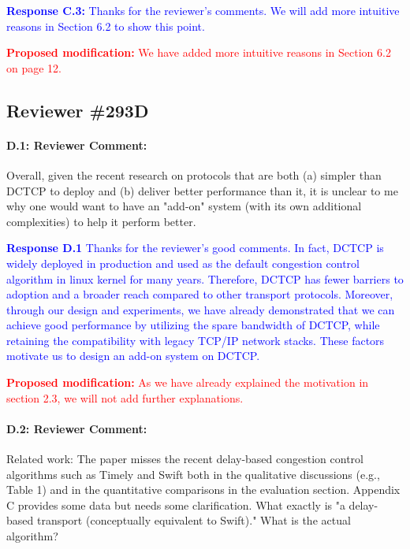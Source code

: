 \documentclass[12pt,one-column]{article}
\begin{document}
\noindent\textcolor{blue}{\textbf{Response C.3:}
Thanks for the reviewer's comments. 
We will add more intuitive reasons in Section 6.2 to show this point.
}

\noindent\textcolor{red}{\textbf{Proposed modification: }
We have added more intuitive reasons in Section 6.2 on page 12.
}

\subsection{Reviewer \#293D}

{\it \paragraph{D.1: Reviewer Comment:}Overall, given the recent research on protocols that are both (a) simpler than DCTCP to deploy and (b) deliver better performance than it, it is unclear to me why one would want to have an "add-on" system (with its own additional complexities) to help it perform better.}

\noindent\textcolor{blue}{\textbf{Response D.1}
Thanks for the reviewer's good comments.
In fact, DCTCP is widely deployed in production and used as the default congestion control algorithm in linux kernel for many years.
Therefore, DCTCP has fewer barriers to adoption and a broader reach compared to other transport protocols.
Moreover, through our design and experiments, we have already demonstrated that we can achieve good performance by utilizing the spare bandwidth of DCTCP, while retaining the compatibility with legacy TCP/IP network stacks.
These factors motivate us to design an add-on system on DCTCP.
} 

\noindent\textcolor{red}{\textbf{Proposed modification: }
As we have already explained the motivation in section 2.3, we will not add further explanations.
}

{\it \paragraph{D.2: Reviewer Comment:}Related work: The paper misses the recent delay-based congestion control algorithms such as Timely and Swift both in the qualitative discussions (e.g., Table 1) and in the quantitative comparisons in the evaluation section. Appendix C provides some data but needs some clarification. What exactly is "a delay-based transport (conceptually equivalent to Swift)." What is the actual algorithm?}
\end{document}
